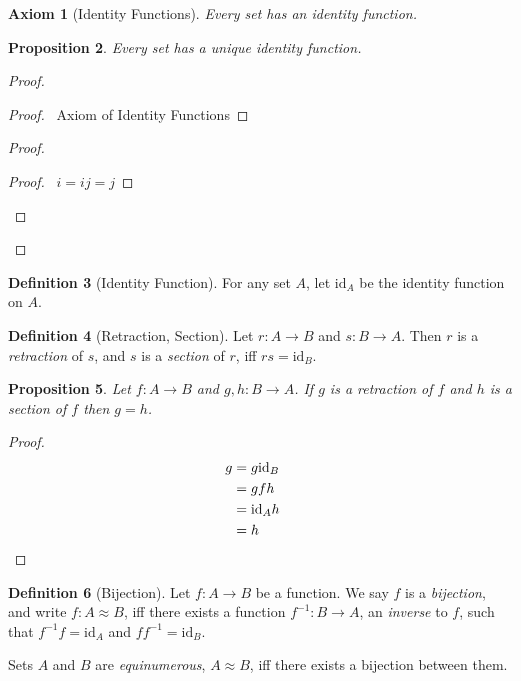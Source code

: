 \documentclass{book}
\let\qed\relax
\newtheorem{ax}{Axiom}[chapter]
\newtheorem{prop}[ax]{Proposition}
\theoremstyle{definition}
\newtheorem{df}[ax]{Definition}
\newcommand{\id}[1]{\ensuremath{\mathrm{id}_{#1}}}
\newcommand{\inv}[1]{\ensuremath{{#1}^{-1}}}
\begin{document}
\begin{ax}[Identity Functions]
Every set has an identity function.
\end{ax}

\begin{prop}
Every set has a unique identity function.
\end{prop}

\begin{proof}
\pf
{}
\begin{proof}
	\pf\ Axiom of Identity Functions
\end{proof}
\begin{proof}
	\begin{proof}
		\pf\ $i = ij = j$
	\end{proof}
\end{proof}
\qed
\end{proof}

\begin{df}[Identity Function]
For any set $A$, let $\id{A}$ be the identity function on $A$.
\end{df}

\begin{df}[Retraction, Section]
Let $r : A \rightarrow B$ and $s : B \rightarrow A$. Then $r$ is a \emph{retraction} of $s$, and $s$ is a \emph{section} of $r$, iff $rs = \id{B}$.
\end{df}

\begin{prop}
\label{prop:retraction_equals_section}
Let $f : A \rightarrow B$ and $g,h : B \rightarrow A$. If $g$ is a retraction of $f$ and $h$ is a section of $f$ then $g = h$.
\end{prop}

\begin{proof}
\pf
\begin{align*}
g & = g \id{B} \\
& = gfh \\
& = \id{A} h \\
& = h & \qed
\end{align*}
\end{proof}

\begin{df}[Bijection]
Let $f : A \rightarrow B$ be a function. We say $f$ is a \emph{bijection}, and write $f : A \approx B$, iff there exists a function $\inv{f} : B \rightarrow A$, an \emph{inverse} to $f$, such that $\inv{f} f = \id{A}$ and $f \inv{f} = \id{B}$.

Sets $A$ and $B$ are \emph{equinumerous}, $A \approx B$, iff there exists a bijection between them.
\end{df}
\end{document}
